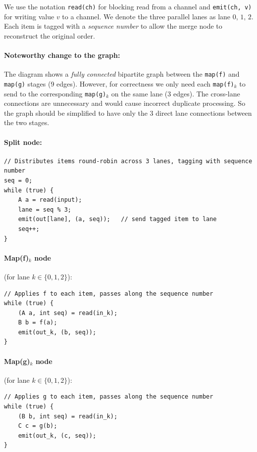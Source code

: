 \documentclass[11pt]{article}
\newcommand{\mnt}[1]{{\small\texttt{#1}}}
\theoremstyle{definition}
\begin{document}
We use the notation \mnt{read(ch)} for blocking read from a channel and \mnt{emit(ch, v)} for writing value $v$ to a channel. We denote the three parallel lanes as lane $0$, $1$, $2$. Each item is tagged with a \emph{sequence number} to allow the merge node to reconstruct the original order.

\paragraph{Noteworthy change to the graph:} The diagram shows a \emph{fully connected} bipartite graph between the \mnt{map(f)} and \mnt{map(g)} stages (9 edges). However, for correctness we only need each \mnt{map(f)}$_k$ to send to the corresponding \mnt{map(g)}$_k$ on the same lane (3 edges). The cross-lane connections are unnecessary and would cause incorrect duplicate processing. So the graph should be simplified to have only the 3 direct lane connections between the two stages.

\paragraph{Split node:}
\begin{verbatim}
// Distributes items round-robin across 3 lanes, tagging with sequence number
seq = 0;
while (true) {
    A a = read(input);
    lane = seq % 3;
    emit(out[lane], (a, seq));   // send tagged item to lane
    seq++;
}
\end{verbatim}

\paragraph{Map(f)$_k$ node} (for lane $k \in \{0, 1, 2\}$):
\begin{verbatim}
// Applies f to each item, passes along the sequence number
while (true) {
    (A a, int seq) = read(in_k);
    B b = f(a);
    emit(out_k, (b, seq));
}
\end{verbatim}

\paragraph{Map(g)$_k$ node} (for lane $k \in \{0, 1, 2\}$):
\begin{verbatim}
// Applies g to each item, passes along the sequence number
while (true) {
    (B b, int seq) = read(in_k);
    C c = g(b);
    emit(out_k, (c, seq));
}
\end{verbatim}
\end{document}
